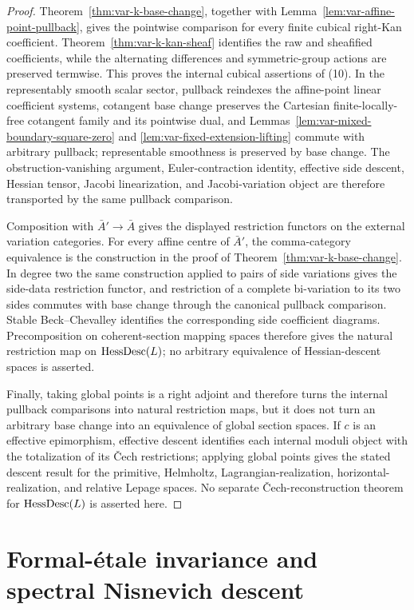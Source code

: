 \begin{proof}
Theorem~\ref{thm:var-k-base-change}, together with Lemma~\ref{lem:var-affine-point-pullback}, gives the pointwise comparison for every finite cubical right-Kan coefficient. Theorem~\ref{thm:var-k-kan-sheaf} identifies the raw and sheafified coefficients, while the alternating differences and symmetric-group actions are preserved termwise. This proves the internal cubical assertions of (10).  In the representably smooth scalar sector, pullback reindexes the affine-point linear coefficient systems, cotangent base change preserves the Cartesian finite-locally-free cotangent family and its pointwise dual, and Lemmas~\ref{lem:var-mixed-boundary-square-zero} and \ref{lem:var-fixed-extension-lifting} commute with arbitrary pullback; representable smoothness is preserved by base change.  The obstruction-vanishing argument, Euler-contraction identity, effective side descent, Hessian tensor, Jacobi linearization, and Jacobi-variation object are therefore transported by the same pullback comparison.

Composition with \(\bar A'\to\bar A\) gives the displayed restriction functors on the external variation categories. For every affine centre of \(\bar A'\), the comma-category equivalence is the construction in the proof of Theorem~\ref{thm:var-k-base-change}. In degree two the same construction applied to pairs of side variations gives the side-data restriction functor, and restriction of a complete bi-variation to its two sides commutes with base change through the canonical pullback comparison. Stable Beck--Chevalley identifies the corresponding side coefficient diagrams. Precomposition on coherent-section mapping spaces therefore gives the natural restriction map on \(\operatorname{HessDesc}(L)\); no arbitrary equivalence of Hessian-descent spaces is asserted.

Finally, taking global points is a right adjoint and therefore turns the internal pullback comparisons into natural restriction maps, but it does not turn an arbitrary base change into an equivalence of global section spaces. If \(c\) is an effective epimorphism, effective descent identifies each internal moduli object with the totalization of its Čech restrictions; applying global points gives the stated descent result for the primitive, Helmholtz, Lagrangian-realization, horizontal-realization, and relative Lepage spaces. No separate Čech-reconstruction theorem for \(\operatorname{HessDesc}(L)\) is asserted here.
\end{proof}

\section{Formal-\'etale invariance and spectral Nisnevich descent}
\label{sec:var-nisnevich}

